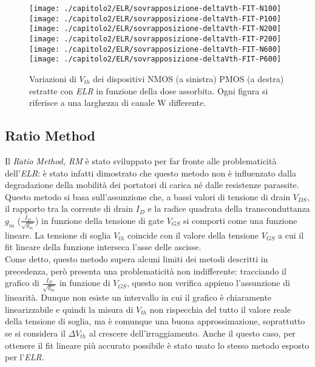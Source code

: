 \begin{figure}[H]
  \centering
  \texttt{[image: ./capitolo2/ELR/sovrapposizione-deltaVth-FIT-N100]}
  \texttt{[image: ./capitolo2/ELR/sovrapposizione-deltaVth-FIT-P100]}
  \texttt{[image: ./capitolo2/ELR/sovrapposizione-deltaVth-FIT-N200]}
  \texttt{[image: ./capitolo2/ELR/sovrapposizione-deltaVth-FIT-P200]}
  \texttt{[image: ./capitolo2/ELR/sovrapposizione-deltaVth-FIT-N600]}
  \texttt{[image: ./capitolo2/ELR/sovrapposizione-deltaVth-FIT-P600]}
  \caption[Dati $\Delta V_{th}$ estratti con ELR]{Variazioni di $V_{th}$ dei dispositivi NMOS (a sinistra) PMOS (a destra) estratte con \emph{ELR} in funzione della dose assorbita. Ogni figura si riferisce a una larghezza di canale W differente.}
\end{figure}

\subsection[RM]{Ratio Method}
Il \emph{Ratio Method, RM} è stato sviluppato per far fronte alle problematicità dell'\emph{ELR}: è stato infatti dimostrato che questo metodo non è influenzato dalla degradazione della mobilità dei portatori di carica né dalle resistenze parassite\cite{art2}. Questo metodo si basa sull'assunzione che, a bassi valori di tensione di drain $V_{DS}$, il rapporto tra la corrente di drain $I_D$ e la radice quadrata della transconduttanza $g_m$ ($\frac{I_D}{\sqrt{g_m}}$) in funzione della tensione di gate $V_{GS}$ si comporti come una funzione lineare. La tensione di soglia $V_{th}$ coincide con il valore della tensione $V_{GS}$ a cui il fit lineare della funzione interseca l'asse delle ascisse.\\
Come detto, questo metodo supera alcuni limiti dei metodi descritti in precedenza, però presenta una problematicità non indifferente: tracciando il grafico di $\frac{I_D}{\sqrt{g_m}}$ in funzione di $V_{GS}$, questo non verifica appieno l'assunzione di linearità. Dunque non esiste un intervallo in cui il grafico è chiaramente linearizzabile e quindi la misura di $V_{th}$ non rispecchia del tutto il valore reale della tensione di soglia, ma è comunque una buona approssimazione, soprattutto se si considera il $\Delta V_{th}$ al crescere dell'irraggiamento.
Anche il questo caso, per ottenere il fit lineare più accurato possibile è stato usato lo stesso metodo esposto per l'\emph{ELR}.


